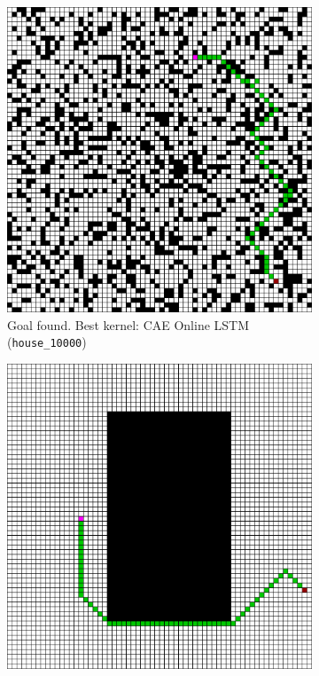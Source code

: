 \begin{figure}[h!]
  \centerfloat
  \begin{subfigure}[b]{0.33\linewidth}
    \includegraphics[width=\linewidth]{images/lstm_bagging_1.png}
     \caption{Goal found. Best kernel: CAE Online LSTM (\texttt{house\_10000})\newline \newline \newline}
  \end{subfigure}
  \hfill
  \begin{subfigure}[b]{0.33\linewidth}
    \includegraphics[width=\linewidth]{images/lstm_bagging_2.png}

\end{subfigure}
\end{figure}

